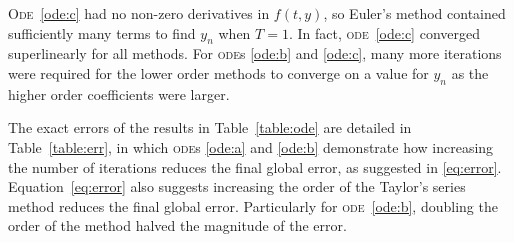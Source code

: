\documentclass[a4paper,12pt,twocolumn]{article}
\begin{document}
\textsc{Ode}~\eqref{ode:c} had no non-zero derivatives in $f(t,y)$, so Euler's 
method contained sufficiently many terms to find $y_n$ when $T=1$. In fact, 
\textsc{ode}~\eqref{ode:c} converged superlinearly for all methods. For 
\textsc{ode}s \eqref{ode:b} and \eqref{ode:c}, many more iterations were 
required for the lower order methods to converge on a value for $y_n$ as the
higher order coefficients were larger.

The exact errors of the results in Table~\ref{table:ode} are detailed in 
Table~\ref{table:err}, in which \textsc{ode}s \eqref{ode:a} and \eqref{ode:b} 
demonstrate how increasing the number of iterations reduces the final global 
error, as suggested in \eqref{eq:error}. Equation~\eqref{eq:error} also 
suggests increasing the order of the Taylor's series method reduces the final 
global error. Particularly for \textsc{ode}~\eqref{ode:b}, doubling the order 
of the method halved the magnitude of the error.
\end{document}

